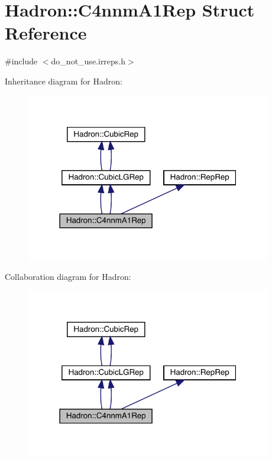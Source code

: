 \hypertarget{structHadron_1_1C4nnmA1Rep}{}\section{Hadron\+:\+:C4nnm\+A1\+Rep Struct Reference}
\label{structHadron_1_1C4nnmA1Rep}


{\ttfamily \#include $<$do\+\_\+not\+\_\+use.\+irreps.\+h$>$}



Inheritance diagram for Hadron\+:\nopagebreak
\begin{figure}[H]
\begin{center}
\leavevmode
\includegraphics[width=303pt]{d3/d7d/structHadron_1_1C4nnmA1Rep__inherit__graph}
\end{center}
\end{figure}


Collaboration diagram for Hadron\+:\nopagebreak
\begin{figure}[H]
\begin{center}
\leavevmode
\includegraphics[width=303pt]{d3/d05/structHadron_1_1C4nnmA1Rep__coll__graph}
\end{center}
\end{figure}
